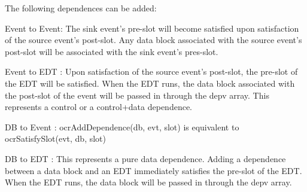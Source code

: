 \descr
The following dependences can be added\-:
\begin{DoxyItemize}
\item Event to Event\-: The sink event's pre-\/slot will become satisfied upon satisfaction of the source event's post-\/slot. Any data block associated with the source event's post-\/slot will be associated with the sink event's pres-\/slot.
\item Event to E\-D\-T \-: Upon satisfaction of the source event's post-\/slot, the pre-\/slot of the E\-D\-T will be satisfied. When the E\-D\-T runs, the data block associated with the post-\/slot of the event will be passed in through the depv array. This represents a control or a control+data dependence.
\item D\-B to Event \-: ocr\-Add\-Dependence(db, evt, slot) is equivalent to ocr\-Satisfy\-Slot(evt, db, slot)
\item D\-B to E\-D\-T \-: This represents a pure data dependence. Adding a dependence between a data block and an E\-D\-T immediately satisfies the pre-\/slot of the E\-D\-T. When the E\-D\-T runs, the data block will be passed in through the depv array.
\end{DoxyItemize}









